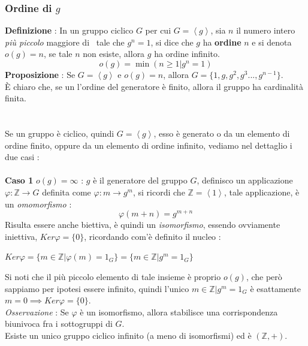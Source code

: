 \documentclass[12pt, letterpaper]{article}
\begin{document}
\subsubsection{Ordine di \(g\)}
\textbf{Definizione }: In un gruppo ciclico \(G\) per cui \(G=\left\langle g\right\rangle\),
sia \(n\) il numero intero \textit{più piccolo} maggiore di \ tale che \(g^n=1\), si dice 
che \(g\) ha \textbf{ordine} \(n\) e si denota \(o(g)=n\), se tale \(n\) non esiste, allora \(g\) ha ordine infinito.
\begin{equation}
    o(g)=\min(n\ge 1|g^n=1)
\end{equation}
\textbf{Proposizione }: Se \(G=\left\langle g\right\rangle\) e \(o(g)=n\), allora 
\(G=\{1,g,g^2,g^3...,g^{n-1}\}\). \\
È chiaro che, se un l'ordine del generatore è finito, allora il gruppo ha cardinalità finita.
\\\hphantom{}\\\hphantom{}\\
Se un gruppo è ciclico, quindi \(G=\left\langle g\right\rangle\), esso è generato 
o da un elemento di ordine finito, oppure da un elemento di ordine infinito, vediamo nel 
dettaglio i due casi :\\\hphantom{}\\
\textbf{Caso 1 }\( o(g)=\infty\) : \(g\) è il generatore del gruppo \(G\), definisco un applicazione 
\(\varphi : \mathbb{Z}\rightarrow G\) definita come \(\varphi : m \rightarrow g^m\), 
si ricordi che \(\mathbb{Z}=\left\langle1\right\rangle\), tale applicazione, 
è un \textit{omomorfismo} : \begin{equation}
    \varphi(m+n)=g^{m+n}
\end{equation}
Risulta essere anche biettiva, è quindi un \textit{isomorfismo}, essendo 
ovviamente iniettiva, \(Ker\varphi = \{0\}\), ricordando com'è definito 
il nucleo :
\begin{center} \(Ker\varphi = \{m\in \mathbb{Z}|\varphi(m)=1_G\}=\{m\in \mathbb{Z}|g^m=1_G\}\)\end{center} Si noti che il più piccolo 
elemento di tale insieme è proprio \(o(g)\), che però sappiamo per ipotesi 
essere infinito, quindi l'unico  \(m\in \mathbb{Z}|g^m=1_G\) è 
esattamente \(m=0\implies Ker\varphi = \{0\}\).\\
\textit{Osservazione }: Se \(\varphi\) è un isomorfismo, allora stabilisce una 
corrispondenza biunivoca fra i sottogruppi di \(G\).\\
Esiste un unico gruppo ciclico infinito (a meno di isomorfismi) ed è \((\mathbb{Z},+)\).
\end{document}
